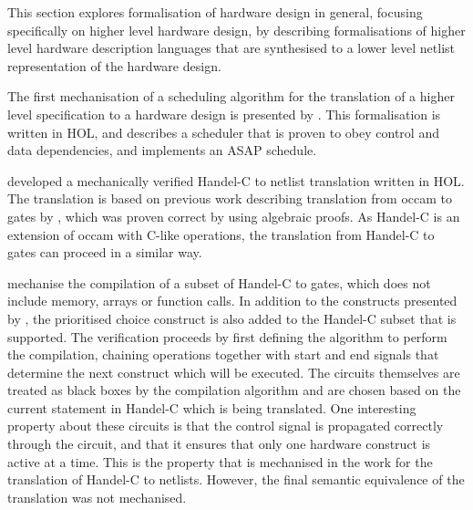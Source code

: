 This section explores formalisation of hardware design in general, focusing
specifically on higher level hardware design, by describing formalisations of
higher level hardware description languages that are synthesised to a lower
level netlist representation of the hardware design.

The first mechanisation of a scheduling algorithm for the translation of a
higher level specification to a hardware design is presented by
\textcite{anderson94_vsa}.  This formalisation is written in HOL, and describes
a scheduler that is proven to obey control and data dependencies, and implements
an ASAP schedule.

\textcite{perna12_mechan_wire_wise_verif_handel_c_synth} developed a
mechanically verified Handel-C to netlist translation written in HOL.  The
translation is based on previous work describing translation from occam to gates
by \textcite{page91_compil_occam}, which was proven correct by
\textcite{jifeng93_towar} using algebraic proofs.  As Handel-C is an extension
of occam with C-like operations, the translation from Handel-C to gates can
proceed in a similar way.

\citeauthor{perna12_mechan_wire_wise_verif_handel_c_synth} mechanise the
compilation of a subset of Handel-C to gates, which does not include memory,
arrays or function calls.  In addition to the constructs presented by
\citeauthor{page91_compil_occam}, the prioritised choice construct is also added
to the Handel-C subset that is supported.  The verification proceeds by first
defining the algorithm to perform the compilation, chaining operations together
with start and end signals that determine the next construct which will be
executed.  The circuits themselves are treated as black boxes by the compilation
algorithm and are chosen based on the current statement in Handel-C which is
being translated.  One interesting property about these circuits is that the
control signal is propagated correctly through the circuit, and that it ensures
that only one hardware construct is active at a time.  This is the property that
is mechanised in the work for the translation of Handel-C to netlists.  However,
the final semantic equivalence of the translation was not mechanised.

